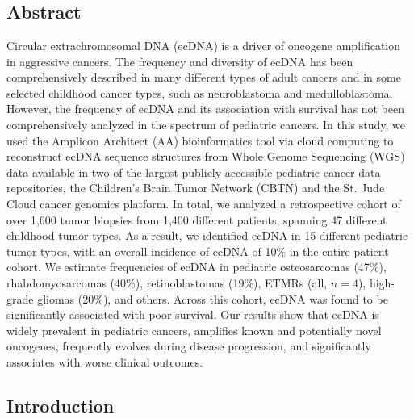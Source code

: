 \chapter{\pedpancantitle}
\label{chap:pedpancan}

\section{Abstract}

Circular extrachromosomal DNA (ecDNA) is a driver of oncogene amplification in aggressive cancers. The frequency and diversity of ecDNA has been comprehensively described in many different types of adult cancers and in some selected childhood cancer types, such as neuroblastoma and medulloblastoma. However, the frequency of ecDNA and its association with survival has not been comprehensively analyzed in the spectrum of pediatric cancers. In this study, we used the Amplicon Architect (AA) bioinformatics tool via cloud computing to reconstruct ecDNA sequence structures from Whole Genome Sequencing (WGS) data available in two of the largest publicly accessible pediatric cancer data repositories, the Children's Brain Tumor Network (CBTN) and the St. Jude Cloud cancer genomics platform. In total, we analyzed a retrospective cohort of over 1,600 tumor biopsies from 1,400 different patients, spanning 47 different childhood tumor types. As a result, we identified ecDNA in 15 different pediatric tumor types, with an overall incidence of ecDNA of 10\% in the entire patient cohort. We estimate frequencies of ecDNA in pediatric osteosarcomas (47\%), rhabdomyosarcomas (40\%), retinoblastomas (19\%), ETMRs (all, $n=4$), high-grade gliomas (20\%), and others. Across this cohort, ecDNA was found to be significantly associated with poor survival. Our results show that ecDNA is widely prevalent in pediatric cancers, amplifies known and potentially novel oncogenes, frequently evolves during disease progression, and significantly associates with worse clinical outcomes.

\section{Introduction}

